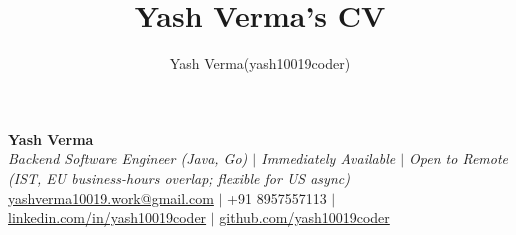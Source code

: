\documentclass[letterpaper,10pt]{article}
\title{Yash Verma's CV}
\author{Yash Verma(yash10019coder)}
\begin{document}

\begin{center}
{\large \bf Yash Verma}\\
\textit{Backend Software Engineer (Java, Go) $|$ Immediately Available $|$ Open to Remote (IST, EU business-hours overlap; flexible for US async)}\\
\href{mailto:yashverma10019.work@gmail.com}{yashverma10019.work@gmail.com} $|$ +91 8957557113 $|$ \href{https://linkedin.com/in/yash10019coder}{linkedin.com/in/yash10019coder} $|$ \href{https://github.com/yash10019coder}{github.com/yash10019coder}
\end{center}


\end{document}

